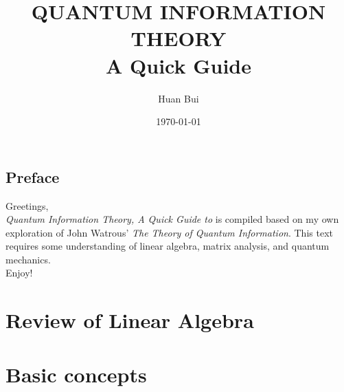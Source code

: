 \documentclass{article}
\theoremstyle{definition}
\begin{document}
	\begin{titlepage}\centering
		\clearpage
		\title{\textsc{\bf{QUANTUM INFORMATION THEORY}}\\\smallskip A Quick Guide\\}
		\author{\bigskip Huan Bui}
		\date{\today}
		\maketitle
		\thispagestyle{empty}
	\end{titlepage}

\newpage

\subsection*{Preface}

Greetings,\\

\textit{Quantum Information Theory, A Quick Guide to} is compiled based on my own exploration of John Watrous'
\textit{The Theory of Quantum Information}. This text requires some understanding of linear algebra, matrix analysis, and quantum mechanics. \\

Enjoy!


\newpage
\tableofcontents
\newpage

\section{Review of Linear Algebra}
\section{Basic concepts}

\newpage
\end{document}

